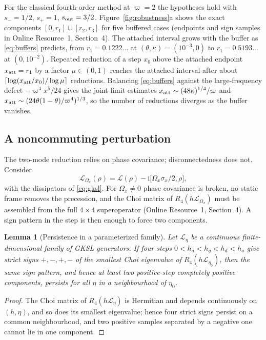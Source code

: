 \documentclass[pdflatex,sn-mathphys-num]{sn-jnl}
\newcommand{\ii}{\mathrm{i}}
\newcommand{\Lgen}{\mathcal L}
\theoremstyle{thmstyleone}
\newtheorem{lemma}[theorem]{Lemma}
\theoremstyle{thmstylethree}
\theoremstyle{thmstyletwo}
\begin{document}
For the classical fourth-order method at $\varpi=2$ the hypotheses hold with $s_-=1/2$, $s_+=1$, $s_{\rm out}=3/2$. Figure~\ref{fig:robustness}a shows the exact components $[0,r_1]\cup[r_2,r_3]$ for five buffered cases (endpoints and sign samples in Online Resource~1, Section~4). The attached interval grows with the buffer as \eqref{eq:buffers} predicts, from $r_1=0.1222\ldots$ at $(\theta,\kappa)=(10^{-3},0)$ to $r_1=0.5193\ldots$ at $(0,10^{-2})$. Repeated reduction of a step $x_0$ above the attached endpoint $x_{\rm att}=r_1$ by a factor $\mu\in(0,1)$ reaches the attached interval after about $\lceil\log(x_{\rm att}/x_0)/\log\mu\rceil$ reductions. Balancing \eqref{eq:buffers} against the large-frequency defect $-\varpi^4x^5/24$ gives the joint-limit estimates $x_{\rm att}\sim(48\kappa)^{1/4}/\varpi$ and $x_{\rm att}\sim(24\theta(1-\theta)/\varpi^4)^{1/3}$, so the number of reductions diverges as the buffer vanishes.

\subsection{A noncommuting perturbation}\label{sec:noncommuting}

The two-mode reduction relies on phase covariance; disconnectedness does not. Consider
\begin{equation}
 \Lgen_{\Omega_x}(\rho)=\Lgen(\rho)-\ii\big[\Omega_x\sigma_x/2,\rho\big],
 \label{eq:transverse}
\end{equation}
with the dissipators of \eqref{eq:gksl}. For $\Omega_x\ne0$ phase covariance is broken, no static frame removes the precession, and the Choi matrix of $R_4(h\Lgen_{\Omega_x})$ must be assembled from the full $4\times4$ superoperator (Online Resource~1, Section~4). A sign pattern in the step is then enough to force two components.

\begin{lemma}[Persistence in a parameterized family]\label{prop:noncommuting}
Let $\Lgen_\eta$ be a continuous finite-dimensional family of GKSL generators. If four steps $0<h_a<h_g<h_d<h_o$ give strict signs $+,-,+,-$ of the smallest Choi eigenvalue of $R_4(h\Lgen_{\eta_0})$, then the same sign pattern, and hence at least two positive-step completely positive components, persists for all $\eta$ in a neighbourhood of $\eta_0$.
\end{lemma}

\begin{proof}
The Choi matrix of $R_4(h\Lgen_\eta)$ is Hermitian and depends continuously on $(h,\eta)$, and so does its smallest eigenvalue; hence four strict signs persist on a common neighbourhood, and two positive samples separated by a negative one cannot lie in one component.
\end{proof}
\end{document}
